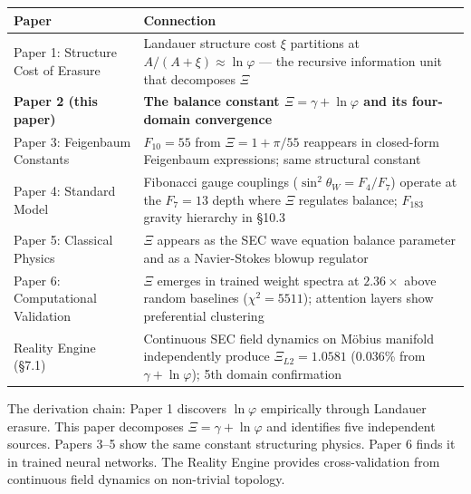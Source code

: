 \documentclass[
  11pt,
  a4paper]{article}
\begin{document}
\begin{longtable}[]{@{}
  >{\raggedright\arraybackslash}p{}
  >{\raggedright\arraybackslash}p{}@{}}
\toprule\noalign{}
\begin{minipage}[b]{\linewidth}\raggedright
Paper
\end{minipage} & \begin{minipage}[b]{\linewidth}\raggedright
Connection
\end{minipage} \\
\midrule\noalign{}
\endhead
\bottomrule\noalign{}
\endlastfoot
Paper 1: Structure Cost of Erasure & Landauer structure cost \(\xi\)
partitions at \(A/(A+\xi) \approx \ln\varphi\) --- the recursive
information unit that decomposes \(\Xi\) \\
\textbf{Paper 2 (this paper)} & \textbf{The balance constant
\(\Xi = \gamma + \ln\varphi\) and its four-domain convergence} \\
Paper 3: Feigenbaum Constants & \(F_{10} = 55\) from
\(\Xi = 1 + \pi/55\) reappears in closed-form Feigenbaum expressions;
same structural constant \\
Paper 4: Standard Model & Fibonacci gauge couplings
(\(\sin^2\theta_W = F_4/F_7\)) operate at the \(F_7 = 13\) depth where
\(\Xi\) regulates balance; \(F_{183}\) gravity hierarchy in §10.3 \\
Paper 5: Classical Physics & \(\Xi\) appears as the SEC wave equation
balance parameter and as a Navier-Stokes blowup regulator \\
Paper 6: Computational Validation & \(\Xi\) emerges in trained weight
spectra at \(2.36\times\) above random baselines (\(\chi^2 = 5511\));
attention layers show preferential clustering \\
Reality Engine (§7.1) & Continuous SEC field dynamics on Möbius manifold
independently produce \(\Xi_{L2} = 1.0581\) (0.036\% from
\(\gamma + \ln\varphi\)); 5th domain confirmation \\
\end{longtable}

The derivation chain: Paper 1 discovers \(\ln\varphi\) empirically
through Landauer erasure. This paper decomposes
\(\Xi = \gamma + \ln\varphi\) and identifies five independent sources.
Papers 3--5 show the same constant structuring physics. Paper 6 finds it
in trained neural networks. The Reality Engine provides cross-validation
from continuous field dynamics on non-trivial topology.
\end{document}
